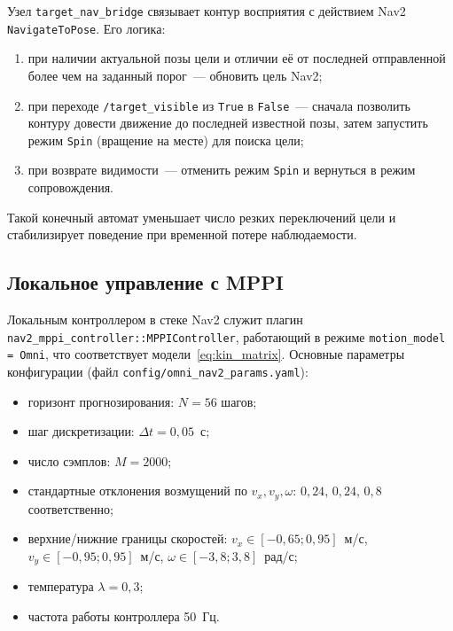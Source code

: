 Узел \texttt{target\_nav\_bridge} связывает контур восприятия с
действием Nav2 \texttt{NavigateToPose}. Его логика:
\begin{enumerate}
    \item при наличии актуальной позы цели и отличии её от последней
          отправленной более чем на заданный порог~--- обновить цель
          Nav2;
    \item при переходе \texttt{/target\_visible} из \texttt{True} в
          \texttt{False}~--- сначала позволить контуру довести движение
          до последней известной позы, затем запустить режим
          \texttt{Spin} (вращение на месте) для поиска цели;
    \item при возврате видимости~--- отменить режим \texttt{Spin}
          и вернуться в режим сопровождения.
\end{enumerate}

Такой конечный автомат уменьшает число резких переключений цели и
стабилизирует поведение при временной потере наблюдаемости.

\subsection{Локальное управление с MPPI}

Локальным контроллером в стеке Nav2 служит плагин
\texttt{nav2\_mppi\_controller::MPPIController}, работающий в режиме
\texttt{motion\_model = Omni}, что соответствует модели~\eqref{eq:kin_matrix}.
Основные параметры конфигурации (файл
\texttt{config/omni\_nav2\_params.yaml}):
\begin{itemize}
    \item горизонт прогнозирования: $N = 56$ шагов;
    \item шаг дискретизации: $\Delta t = 0{,}05$~с;
    \item число сэмплов: $M = 2000$;
    \item стандартные отклонения возмущений по
          $v_x, v_y, \omega$: $0{,}24$, $0{,}24$, $0{,}8$ соответственно;
    \item верхние/нижние границы скоростей:
          $v_x \in [-0{,}65; 0{,}95]$~м/с, $v_y \in [-0{,}95; 0{,}95]$~м/с,
          $\omega \in [-3{,}8; 3{,}8]$~рад/с;
    \item температура $\lambda = 0{,}3$;
    \item частота работы контроллера 50~Гц.
\end{itemize}

